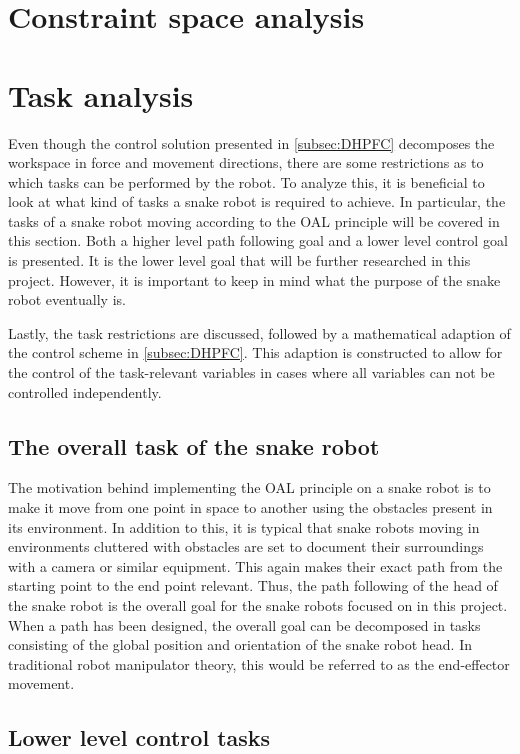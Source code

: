 \section{Constraint space analysis}

\section{Task analysis}

Even though the control solution presented in \ref{subsec:DHPFC} decomposes the workspace in force and movement directions, there are some restrictions as to which tasks can be performed by the robot. To analyze this, it is beneficial to look at what kind of tasks a snake robot is required to achieve. In particular, the tasks of a snake robot moving according to the OAL principle will be covered in this section. Both a higher level path following goal and a lower level control goal is presented. It is the lower level goal that will be further researched in this project. However, it is important to keep in mind what the purpose of the snake robot eventually is.

Lastly, the task restrictions are discussed, followed by a mathematical adaption of the control scheme in \ref{subsec:DHPFC}. This adaption is constructed to allow for the control of the task-relevant variables in cases where all variables can not be controlled independently.

\subsection{The overall task of the snake robot}

The motivation behind implementing the OAL principle on a snake robot is to make it move from one point in space to another using the obstacles present in its environment. In addition to this, it is typical that snake robots moving in environments cluttered with obstacles are set to document their surroundings with a camera or similar equipment. This again makes their exact path from the starting point to the end point relevant. Thus, the path following of the head of the snake robot is the overall goal for the snake robots focused on in this project. When a path has been designed, the overall goal can be decomposed in tasks consisting of the global position and orientation of the snake robot head. In traditional robot manipulator theory, this would be referred to as the end-effector movement. 


\subsection{Lower level control tasks}

